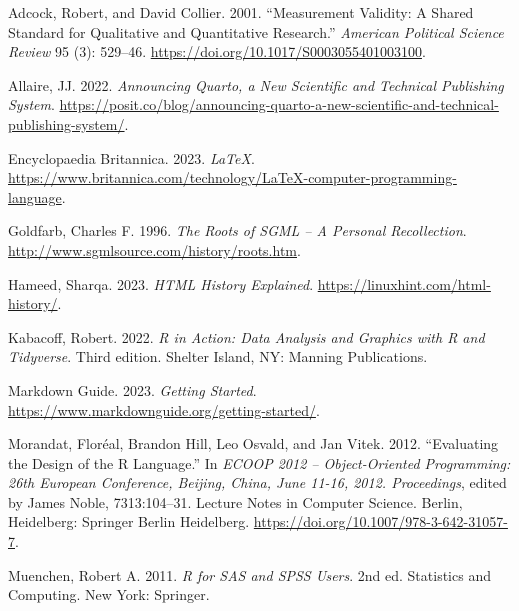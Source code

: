 \documentclass[
  letterpaper,
]{scrbook}
\newlength{\cslhangindent}
\newlength{\cslentryspacingunit} %
\newenvironment{CSLReferences}[2] %
 {%
  \setlength{\parindent}{0pt}
  \ifodd #1
  \let\oldpar\par
  \def\par{\hangindent=\cslhangindent\oldpar}
  \fi
  \setlength{\parskip}{#2\cslentryspacingunit}
 }%
 {}
\begin{document}
\hypertarget{refs}{}
\begin{CSLReferences}{1}{0}
\leavevmode{}%
Adcock, Robert, and David Collier. 2001. {``Measurement {Validity}: {A
Shared Standard} for {Qualitative} and {Quantitative Research}.''}
\emph{American Political Science Review} 95 (3): 529--46.
\url{https://doi.org/10.1017/S0003055401003100}.

\leavevmode{}%
Allaire, JJ. 2022. \emph{Announcing {Quarto}, a New Scientific and
Technical Publishing System}.
\url{https://posit.co/blog/announcing-quarto-a-new-scientific-and-technical-publishing-system/}.

\leavevmode{}%
Encyclopaedia Britannica. 2023. \emph{{LaTeX}}.
\url{https://www.britannica.com/technology/LaTeX-computer-programming-language}.

\leavevmode{}%
Goldfarb, Charles F. 1996. \emph{The {Roots} of {SGML} -- {A Personal
Recollection}}. \url{http://www.sgmlsource.com/history/roots.htm}.

\leavevmode{}%
Hameed, Sharqa. 2023. \emph{{HTML History} \textbar{} {Explained}}.
\url{https://linuxhint.com/html-history/}.

\leavevmode{}%
Kabacoff, Robert. 2022. \emph{R in Action: Data Analysis and Graphics
with {R} and {Tidyverse}}. Third edition. {Shelter Island, NY}: {Manning
Publications}.

\leavevmode{}%
Markdown Guide. 2023. \emph{Getting {Started}}.
\url{https://www.markdownguide.org/getting-started/}.

\leavevmode{}%
Morandat, Floréal, Brandon Hill, Leo Osvald, and Jan Vitek. 2012.
{``Evaluating the {Design} of the {R Language}.''} In \emph{{ECOOP} 2012
-- {Object-Oriented Programming}: 26th {European Conference}, {Beijing},
{China}, {June} 11-16, 2012. {Proceedings}}, edited by James Noble,
7313:104--31. Lecture {Notes} in {Computer Science}. {Berlin,
Heidelberg}: {Springer Berlin Heidelberg}.
\url{https://doi.org/10.1007/978-3-642-31057-7}.

\leavevmode{}%
Muenchen, Robert A. 2011. \emph{R for {SAS} and {SPSS} Users}. 2nd ed.
Statistics and Computing. {New York}: {Springer}.


\end{CSLReferences}
\end{document}
